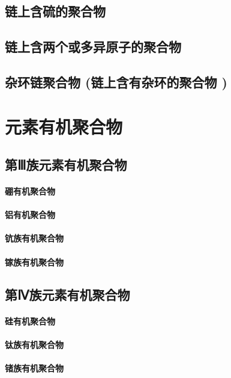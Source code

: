 \documentclass[UTF8]{../03-Chemistry}
\begin{document}
\section{链上含硫的聚合物}
\section{链上含两个或多异原子的聚合物}
\section{杂环链聚合物 (链上含有杂环的聚合物 )}










\chapter{元素有机聚合物}
\section{第Ⅲ族元素有机聚合物}
    \subsubsection{硼有机聚合物}
    \subsubsection{铝有机聚合物}
    \subsubsection{钪族有机聚合物}
    \subsubsection{镓族有机聚合物}
\section{第Ⅳ族元素有机聚合物}
    \subsubsection{硅有机聚合物}
    \subsubsection{钛族有机聚合物}
    \subsubsection{锗族有机聚合物}
\end{document}
